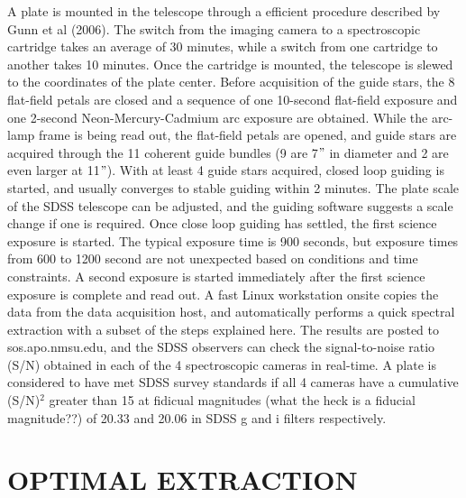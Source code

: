 \documentclass[12pt,preprint]{aastex}
\begin{document}
A plate is mounted in the telescope through a efficient procedure described
by Gunn et al (2006).  The switch from the imaging camera to a spectroscopic
cartridge takes an average of 30 minutes, while a switch from one cartridge
to another takes 10 minutes.  Once the cartridge is mounted, 
the telescope is slewed to the coordinates of the plate center.  
Before acquisition of the guide stars, the 8 flat-field petals are closed and
a sequence of one 10-second flat-field exposure and one 2-second 
Neon-Mercury-Cadmium arc exposure are obtained.  While the arc-lamp frame is
being read out, the flat-field petals are opened, and guide stars are acquired
through the 11 coherent guide bundles (9 are 7$"$ in diameter and 
2 are even larger at 11$"$).
With at least 4 guide stars acquired, closed loop guiding is started, and
usually converges to stable guiding within 2 minutes.
The plate scale of the SDSS telescope can be adjusted, and the guiding software
suggests a scale change if one is required.  Once close loop 
guiding has settled, the first science exposure is started.  The typical 
exposure time is 900 seconds, but exposure times from 600 to 1200 second are
not unexpected based on conditions and time constraints.  A second exposure
is started immediately after the first science exposure is complete and read
out.
A fast Linux workstation onsite copies the data from the data acquisition host,
and automatically performs a quick spectral extraction with a subset of the 
steps explained here.  The results are posted to sos.apo.nmsu.edu, and
the SDSS observers can check the signal-to-noise ratio (S/N) 
obtained in each of the 4 spectroscopic
cameras in real-time.  A plate is considered to have met SDSS survey standards
if all 4 cameras have a cumulative (S/N)$^2$ greater than 15 at 
fidicual magnitudes (what the heck is a fiducial magnitude??)
of 20.33 and 20.06 in SDSS g and i filters respectively.  



\section{OPTIMAL EXTRACTION}
\label{sec_extract}
\end{document}
